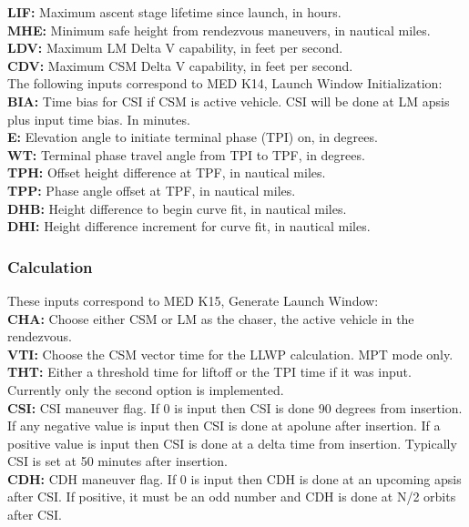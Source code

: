 \documentclass[11pt]{article} %
\begin{document}
\textbf{LIF:} Maximum ascent stage lifetime since launch, in hours.\\
\textbf{MHE:} Minimum safe height from rendezvous maneuvers, in nautical miles.\\
\textbf{LDV:} Maximum LM Delta V capability, in feet per second.\\
\textbf{CDV:} Maximum CSM Delta V capability, in feet per second.\\

The following inputs correspond to MED K14, Launch Window Initialization:\\

\textbf{BIA:} Time bias for CSI if CSM is active vehicle. CSI will be done at LM apsis plus input time bias. In minutes.\\
\textbf{E:} Elevation angle to initiate terminal phase (TPI) on, in degrees.\\
\textbf{WT:} Terminal phase travel angle from TPI to TPF, in degrees.\\ 
\textbf{TPH:} Offset height difference at TPF, in nautical miles.\\
\textbf{TPP:} Phase angle offset at TPF, in nautical miles.\\

\textbf{DHB:} Height difference to begin curve fit, in nautical miles.\\
\textbf{DHI:} Height difference increment for curve fit, in nautical miles.\\
\newpage
\subsubsection{Calculation}

These inputs correspond to MED K15, Generate Launch Window:\\

\textbf{CHA:} Choose either CSM or LM as the chaser, the active vehicle in the rendezvous.\\
\textbf{VTI:} Choose the CSM vector time for the LLWP calculation. MPT mode only.\\
\textbf{THT:} Either a threshold time for liftoff or the TPI time if it was input. Currently only the second option is implemented.\\
\textbf{CSI:} CSI maneuver flag. If 0 is input then CSI is done 90 degrees from insertion. If any negative value is input then CSI is done at apolune after insertion. If a positive value is input then CSI is done at a delta time from insertion. Typically CSI is set at 50 minutes after insertion.\\
\textbf{CDH:} CDH maneuver flag. If 0 is input then CDH is done at an upcoming apsis after CSI. If positive, it must be an odd number and CDH is done at N/2 orbits after CSI.\\
\end{document}
